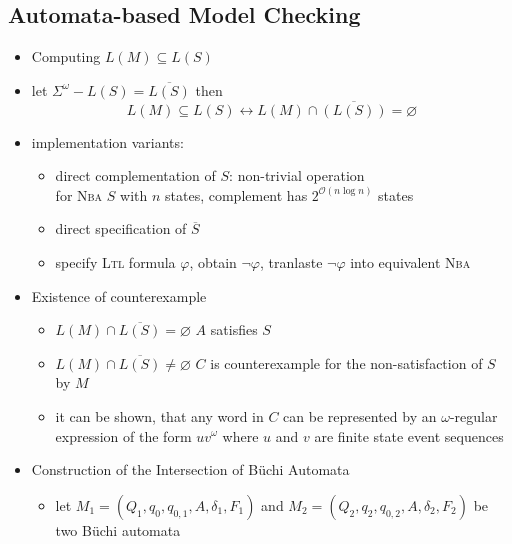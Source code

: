 \documentclass[a4paper, 10pt]{article}
\begin{document}
\subsection*{Automata-based Model Checking}
\begin{itemize}
    \item Computing $L(M)\subseteq L(S)$
    \item let $\Sigma^\omega-L(S)= \overline{L(S)}$ then \[ L(M)\subseteq L(S)\leftrightarrow L(M)\cap \overline{(L(S))} = \varnothing \]
    \item implementation variants:
    \begin{itemize}
        \item direct complementation of $S$: non-trivial operation \\
        for \textsc{Nba} $S$ with $n$ states, complement has $2^{\mathcal{O}(n\log n)}$ states
        \item direct specification of $\overline{S}$
        \item specify \textsc{Ltl} formula $\varphi$, obtain $\neg\varphi$, tranlaste $\neg\varphi$ into equivalent \textsc{Nba}
    \end{itemize}
    \item Existence of counterexample \\
    \begin{minipage}{0.48\textwidth}
    \begin{itemize}
        \item $L(M)\cap \overline{L(S)}=\varnothing$ \follows $A$ satisfies $S$
        \item $L(M)\cap \overline{L(S)}\not=\varnothing$ \follows $C$ is counterexample for the non-satisfaction of $S$ by $M$
        \item it can be shown, that any word in $C$ can be represented by an $\omega$-regular expression of the form $uv^\omega$ where $u$ and $v$ are finite state event sequences
    \end{itemize}
    \end{minipage}
    \hfill \vrule \hfill
    \begin{minipage}{0.48\textwidth}
    \begin{center}
        \scalebox{1}{}
        \end{center}
    \end{minipage}
    \item Construction of the Intersection of Büchi Automata
    \begin{itemize}
        \item let $M_1=(Q_1,q_0,q_{0,1},A,\delta_1,F_1)$ and $M_2=(Q_2,q_2,q_{0,2},A,\delta_2,F_2)$ be two Büchi automata

\end{itemize}
\end{itemize}
\end{document}
